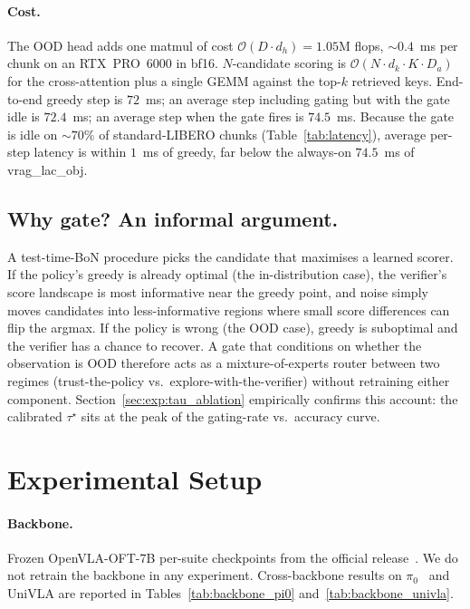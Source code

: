 \documentclass{article}
\begin{document}
\paragraph{Cost.} The OOD head adds one matmul of cost $\mathcal{O}(D\!\cdot\!d_h)
\!=\!1.05$M flops, $\sim\!0.4$~ms per chunk on an RTX~PRO~6000 in bf16.
$N$-candidate scoring is $\mathcal{O}(N\!\cdot\!d_k\!\cdot\!K\!\cdot\!D_a)$ for
the cross-attention plus a single GEMM against the top-$k$ retrieved
keys. End-to-end greedy step is $72$~ms; an average step including
gating but with the gate idle is $72.4$~ms; an average step when the
gate fires is $74.5$~ms. Because the gate is idle on
$\sim\!70\%$ of standard-LIBERO chunks (Table~\ref{tab:latency}),
average per-step latency is within $1$~ms of greedy, far below the
always-on $74.5$~ms of vrag\_lac\_obj.

\subsection{Why gate? An informal argument.}
\label{sec:method:why_gate}

A test-time-BoN procedure picks the candidate that maximises a learned
scorer. If the policy's greedy is already optimal (the in-distribution
case), the verifier's score landscape is most informative near the
greedy point, and noise simply moves candidates into less-informative
regions where small score differences can flip the argmax. If the
policy is wrong (the OOD case), greedy is suboptimal and the verifier
has a chance to recover. A gate that conditions on whether the
observation is OOD therefore acts as a mixture-of-experts router
between two regimes (trust-the-policy vs.\ explore-with-the-verifier)
without retraining either component. Section~\ref{sec:exp:tau_ablation}
empirically confirms this account: the calibrated $\tau^\star$ sits at
the peak of the gating-rate vs.\ accuracy curve.

\section{Experimental Setup}
\label{sec:experiments_setup}

\paragraph{Backbone.} Frozen OpenVLA-OFT-7B per-suite checkpoints from
the official release~\citep{kim2025openvlaoft}. We do not retrain the
backbone in any experiment. Cross-backbone results on
$\pi_0$~\citep{pi02024} and UniVLA are reported in
Tables~\ref{tab:backbone_pi0} and~\ref{tab:backbone_univla}.
\end{document}
